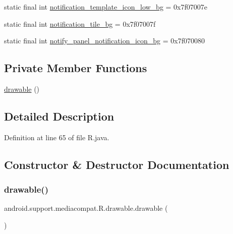 \begin{DoxyCompactItemize}
\item 
static final int \mbox{\hyperlink{classandroid_1_1support_1_1mediacompat_1_1_r_1_1drawable_aa387aaa3835959e25ba0b23273f5cdde}{notification\+\_\+template\+\_\+icon\+\_\+low\+\_\+bg}} = 0x7f07007e
\item 
static final int \mbox{\hyperlink{classandroid_1_1support_1_1mediacompat_1_1_r_1_1drawable_a3e361078e38f4d19d7c16e43feafd1e2}{notification\+\_\+tile\+\_\+bg}} = 0x7f07007f
\item 
static final int \mbox{\hyperlink{classandroid_1_1support_1_1mediacompat_1_1_r_1_1drawable_a1111dc9feb55483a5e44a84481588b18}{notify\+\_\+panel\+\_\+notification\+\_\+icon\+\_\+bg}} = 0x7f070080
\end{DoxyCompactItemize}
\subsection*{Private Member Functions}
\begin{DoxyCompactItemize}
\item 
\mbox{\hyperlink{classandroid_1_1support_1_1mediacompat_1_1_r_1_1drawable_a334f70a9ca58d1e365f9e160625d532f}{drawable}} ()
\end{DoxyCompactItemize}


\subsection{Detailed Description}


Definition at line 65 of file R.\+java.



\subsection{Constructor \& Destructor Documentation}
\mbox{\label{classandroid_1_1support_1_1mediacompat_1_1_r_1_1drawable_a334f70a9ca58d1e365f9e160625d532f}} 
\subsubsection{\texorpdfstring{drawable()}{drawable()}}
{\footnotesize\ttfamily android.\+support.\+mediacompat.\+R.\+drawable.\+drawable (\begin{DoxyParamCaption}{ }\end{DoxyParamCaption})\hspace{0.3cm}{\ttfamily [private]}}



